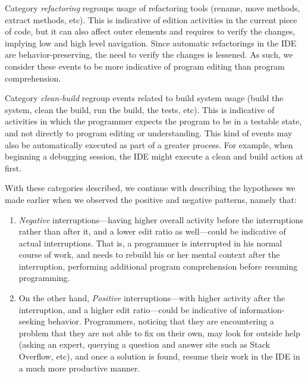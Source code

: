 \documentclass[times]{smrauth}
\newcommand\RR[1]{\textbf{Romain #1}}
\begin{document}
Category \emph{refactoring} regroups usage of refactoring tools (rename, move methods, extract methods, etc). This is indicative of edition activities in the current piece of code, but it can also affect outer elements and requires to verify the changes, implying low and high level navigation. Since automatic refactorings in the IDE are behavior-preserving, the need to verify the changes is lessened. As such, we consider these events to be more indicative of program editing than program comprehension.

Category \emph{clean-build} regroup events related to build system usage (build the system, clean the build, run the build, the tests, etc). This is indicative of activities in which the programmer expects the program to be in a testable state, and not directly to program editing or understanding. This kind of events may also be automatically executed as part of a greater process. For example, when beginning a debugging session, the IDE might execute a clean and build action at first. 


With these categories described, we continue with describing the hypotheses we made earlier when we observed the positive and negative patterns, namely that:

\begin{enumerate}
\item \emph{Negative} interruptions---having higher overall activity before the interruptions rather than after it, and a lower edit ratio as well---could be indicative of actual interruptions. That is, a programmer is interrupted in his normal course of work, and needs to rebuild his or her mental context after the interruption, performing additional program comprehension before resuming programming.
\item On the other hand, \emph{Positive} interruptions---with higher activity after the interruption, and a higher edit ratio---could be indicative of information-seeking behavior. Programmers, noticing that they are encountering a problem that they are not able to fix on their own, may look for outside help (asking an expert, querying a question and answer site such as Stack Overflow, etc), and once a solution is found, resume their work in the IDE in a much more productive manner.
\end{enumerate}
\end{document}
